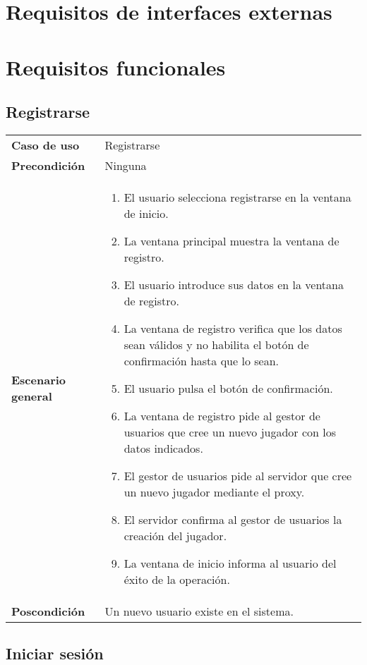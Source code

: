 \section{Requisitos de interfaces externas}

\section{Requisitos funcionales}

\subsection{Registrarse}

{\footnotesize
\begin{tabularx}{0.95\textwidth}{p{}|X}

\textbf{Caso de uso} & Registrarse \\

\textbf{Precondición} & Ninguna \\

\textbf{Escenario general} & \begin{enumerate}
\item El usuario selecciona registrarse en la ventana de inicio.
\item La ventana principal muestra la ventana de registro.
\item El usuario introduce sus datos en la ventana de registro.
\item La ventana de registro verifica que los datos sean válidos y no habilita
el botón de confirmación hasta que lo sean.
\item El usuario pulsa el botón de confirmación.
\item La ventana de registro pide al gestor de usuarios que cree un nuevo
jugador con los datos indicados.
\item El gestor de usuarios pide al servidor que cree un nuevo jugador mediante
el proxy.
\item El servidor confirma al gestor de usuarios la creación del jugador.
\item La ventana de inicio informa al usuario del éxito de la operación.
\end{enumerate} \\

\textbf{Poscondición} & Un nuevo usuario existe en el sistema.

\end{tabularx}
}

\subsection{Iniciar sesión}

